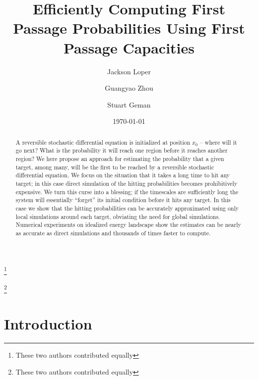 \documentclass[12pt, nofootinbib,english, amsmath, amssymb, aps, priprint, graphicx,floatfix]{revtex4-1}
\theoremstyle{plain}
\theoremstyle{definition}
\theoremstyle{plain}
\begin{document}
\title{Efficiently Computing First Passage Probabilities Using First Passage Capacities} %

\author{Jackson Loper}
\thanks{These two authors contributed equally}

\author{Guangyao Zhou}
\thanks{These two authors contributed equally}

\author{Stuart Geman}

\date{\today}

\begin{abstract}
	A reversible stochastic differential equation is initialized at position $x_0$ -- where will it go next?  What is the probability it will reach one region before it reaches another region?  We here propose an approach for estimating the probability that a given target, among many, will be the first to be reached by a reversible stochastic differential equation.   We focus on the situation that it takes a long time to hit any target; in this case direct simulation of the hitting probabilities becomes prohibitively expensive.  We turn this curse into a blessing; if the timescales are sufficiently long the system will essentially ``forget'' its initial condition before it hits any target.  In this case we show that the hitting probabilities can be accurately approximated using only local simulations around each target, obviating the need for global simulations.  Numerical experiments on idealized energy landscape show the estimates can be nearly as accurate as direct simulations and thousands of times faster to compute.
\end{abstract}

\pacs{}%

\maketitle %

\section{Introduction}
\label{sec:Introduction}
\end{document}
